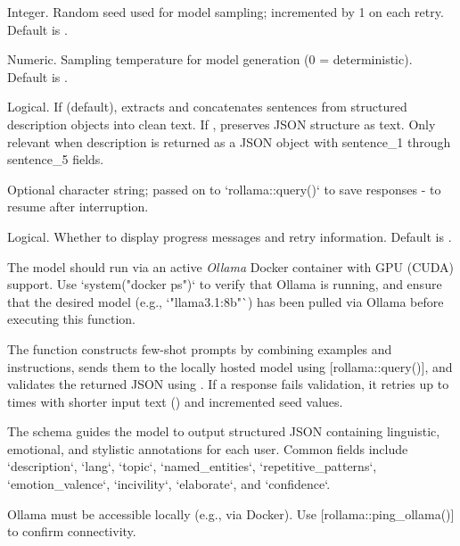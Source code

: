 \documentclass[a4paper]{book}
\begin{document}
\begin{Arguments}
\begin{ldescription}
\item[\code{seed}] Integer. Random seed used for model sampling; incremented by 1 on each retry. Default is .

\item[\code{temp}] Numeric. Sampling temperature for model generation (0 = deterministic). Default is .

\item[\code{keep\_description\_json}] Logical. If  (default), extracts and concatenates sentences from 
structured description objects into clean text. If , preserves JSON structure as text. Only relevant 
when description is returned as a JSON object with sentence\_1 through sentence\_5 fields.

\item[\code{cache\_path}] Optional character string; passed on to `rollama::query()` to save responses - to resume after interruption.

\item[\code{verbose}] Logical. Whether to display progress messages and retry information. Default is .
\end{ldescription}
\end{Arguments}
%
\begin{Details}
The model should run via an active \emph{Ollama} Docker container with GPU (CUDA) support.
Use `system("docker ps")` to verify that Ollama is running, and ensure that the 
desired model (e.g., `"llama3.1:8b"`) has been pulled via Ollama before executing this function.


The function constructs few-shot prompts by combining examples and instructions, sends them to the 
locally hosted model using [rollama::query()], and validates the returned JSON using .
If a response fails validation, it retries up to  times with shorter input text 
() and incremented seed values.

The schema guides the model to output structured JSON containing linguistic, emotional, and stylistic annotations 
for each user. Common fields include `description`, `lang`, `topic`, `named\_entities`, `repetitive\_patterns`, 
`emotion\_valence`, `incivility`, `elaborate`, and `confidence`.

Ollama must be accessible locally (e.g., via Docker). Use [rollama::ping\_ollama()] to confirm connectivity.
\end{Details}
%
\end{document}
